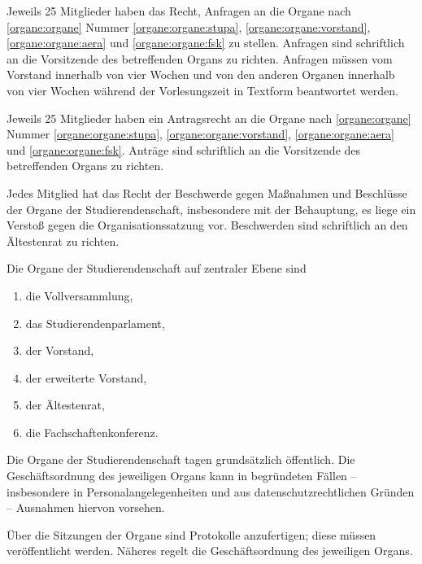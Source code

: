 Jeweils 25 Mitglieder haben das Recht, Anfragen an die Organe nach \ref{organe:organe} Nummer \ref{organe:organe:stupa}, \ref{organe:organe:vorstand}, \ref{organe:organe:aera} und \ref{organe:organe:fsk} zu stellen. Anfragen sind schriftlich an die Vorsitzende des betreffenden Organs zu richten. 
Anfragen müssen vom Vorstand innerhalb von vier Wochen und von den anderen Organen innerhalb von vier Wochen während der Vorlesungszeit in Textform beantwortet werden.\label{studierendenschaft:mitglieder:anfragen}

Jeweils 25 Mitglieder haben ein Antragsrecht an die Organe nach \ref{organe:organe} Nummer \ref{organe:organe:stupa}, \ref{organe:organe:vorstand}, \ref{organe:organe:aera} und \ref{organe:organe:fsk}. Anträge sind schriftlich an die Vorsitzende des betreffenden Organs zu richten.\label{studierendenschaft:mitglieder:antraege}

Jedes Mitglied hat das Recht der Beschwerde gegen Maßnahmen und Beschlüsse der Organe der Studierendenschaft, insbesondere mit der Behauptung, es liege ein Verstoß gegen die Organisationssatzung vor. Beschwerden sind schriftlich an den Ältestenrat zu richten. \label{studierendenschaft:mitglieder:beschwerden} 


Die Organe der Studierendenschaft auf zentraler Ebene sind \label{organe:organe}
\begin{enumerate}
\item die Vollversammlung,
\item das Studierendenparlament, \label{organe:organe:stupa}
\item der Vorstand, \label{organe:organe:vorstand}
\item der erweiterte Vorstand,
\item der Ältestenrat, \label{organe:organe:aera}
\item die Fachschaftenkonferenz. \label{organe:organe:fsk}
\end{enumerate}

Die Organe der Studierendenschaft tagen grundsätzlich öffentlich. Die Geschäftsordnung des jeweiligen Organs kann in begründeten Fällen -- insbesondere in Personalangelegenheiten und aus datenschutzrechtlichen Gründen -- Ausnahmen hiervon vorsehen.

Über die Sitzungen der Organe sind Protokolle anzufertigen; diese müssen veröffentlicht werden. Näheres regelt die Geschäftsordnung des jeweiligen Organs.


